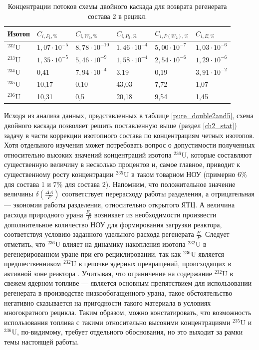 \begin{table}[h]
  \centering
  \caption{Концентрации потоков схемы двойного каскада для возврата регенерата состава 2 в рецикл.{\label{pure_double2}}}
  \begin{tabularx}{\textwidth}{|Y||Y|Y|Y|Y|Y|}
      \hline Изотоп & $C_{i,P_{1}, \%}$ & $C_{i,W_{1}, \%}$ & $C_{i,P_{2}, \%}$ & $C_{i,P(W_{2}), \%}$ & $C_{i,E, \%}$\\ \hline
      $^{232}$U & $1,07\cdot10^{-5}$ & $8,78\cdot10^{-10}$ & $1,46\cdot10^{-4}$ & $5,00\cdot10^{-7}$ & $1,03\cdot10^{-6}$ \\ \hline
      $^{233}$U & $1,35\cdot10^{-5}$ & $5,46\cdot10^{-9}$ & $1,58\cdot10^{-4}$ & $2,54\cdot10^{-6}$ & $1,29\cdot10^{-6}$ \\ \hline
      $^{234}$U & 0,41 & $7,94\cdot10^{-4}$ & 3,19 & 0,19 & $3,91\cdot10^{-2}$ \\ \hline
      $^{235}$U & 10,17 & 0,10 & 43,03 & 7,72 & 1,07 \\ \hline
      $^{236}$U & 10,31 & 0,5 & 20,18 & 9,54 & 1,45 \\ \hline
      \end{tabularx}     
\end{table}

Исходя из анализа данных, представленных в таблице \ref{pure_double2and5}, схема двойного каскада позволяет решить поставленную выше (раздел \ref{ch2_stat}) задачу в части коррекции изотопного состава по концентрациям четных изотопов. Хотя отдельного изучения может потребовать вопрос о допустимости полученных относительно высоких значений концентраций изотопа $^{236}$U, которые составляют существенную величину в несколько процентов и, самое главное, приводит к существенному росту концентрации $^{235}$U в таком товарном НОУ (примерно 6\% для состава 1 и 7\% для состава 2). Напомним, что положительное значение величины $\delta(\frac{\Delta A}{P})$ соответствует перерасходу работы разделения, а отрицательная --- экономии работы разделения, относительно открытого ЯТЦ. А величина расхода природного урана $\frac{F_n}{P}$ возникает из необходимости произвести дополнительное количество НОУ для формирования загрузки реактора, соответствуя условию заданного удельного расхода регенерата $\frac{E}{P}$. Следует отметить, что $^{236}$U влияет на динамику накопления изотопа $^{232}$U в регенерированном уране при его рециклировании, так как $^{236}$U является предшественником $^{232}$U в цепочке ядерных превращений, происходящих в активной зоне реактора \cite{smirnovEvolutionIsotopicComposition2012}. Учитывая, что ограничение на содержание $^{232}$U в свежем ядерном топливе --- является основным препятствием для использовании регенерата в производстве низкообогащенного урана, такое обстоятельство негативно сказывается на пригодности такого материала в условиях многократного рецикла. Таким образом, можно констатировать, что возможность использования топлива с такими относительно высокими концентрациями $^{235}$U и $^{236}$U, по-видимому, требует отдельного обоснования, но это выходит за рамки темы настоящей работы.

